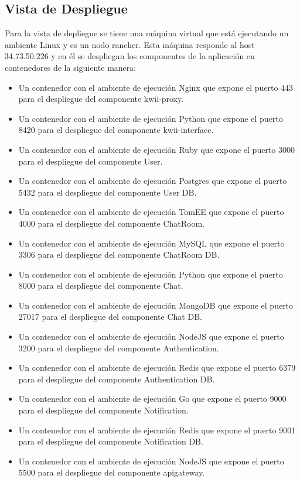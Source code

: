 \subsection{Vista de Despliegue}
Para la vista de depliegue se tiene una máquina virtual que está ejecutando un ambiente Linux y es un nodo rancher. Esta máquina responde al host 34.73.50.226 y en él se despliegan los componentes de la aplicación en contenedores de la siguiente manera:
\begin{itemize}
    \item Un contenedor con el ambiente de ejecución Nginx que expone el puerto 443 para el despliegue del componente kwii-proxy.
    \item Un contenedor con el ambiente de ejecución Python que expone el puerto 8420 para el despliegue del componente kwii-interface.
    \item Un contenedor con el ambiente de ejecución Ruby que expone el puerto 3000 para el despliegue del componente User.
    \item Un contenedor con el ambiente de ejecución Postgres que expone el puerto 5432 para el despliegue del componente User DB.
    \item Un contenedor con el ambiente de ejecución TomEE que expone el puerto 4000 para el despliegue del componente ChatRoom.
    \item Un contenedor con el ambiente de ejecución MySQL que expone el puerto 3306 para el despliegue del componente ChatRoom DB.
    \item Un contenedor con el ambiente de ejecución Python que expone el puerto 8000 para el despliegue del componente Chat.
    \item Un contenedor con el ambiente de ejecución MongoDB que expone el puerto 27017 para el despliegue del componente Chat DB.
    \item Un contenedor con el ambiente de ejecución NodeJS que expone el puerto 3200 para el despliegue del componente Authentication.
    \item Un contenedor con el ambiente de ejecución Redis que expone el puerto 6379 para el despliegue del componente Authentication DB.
    \item Un contenedor con el ambiente de ejecución Go que expone el puerto 9000 para el despliegue del componente Notification.
    \item Un contenedor con el ambiente de ejecución Redis que expone el puerto 9001 para el despliegue del componente Notification DB.
    \item Un contenedor con el ambiente de ejecución NodeJS que expone el puerto 5500 para el despliegue del componente api\textunderscore gateway.
\end{itemize}
